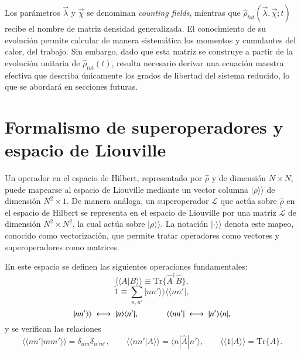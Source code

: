 Los parámetros $\vec{\lambda}$ y $\vec{\chi}$ se denominan \textit{counting fields}\cite{esposito2009nonequilibrium,landi2024current}, mientras que $\hat{\rho}_{tot}(\vec{\lambda},\vec{\chi};t)$ recibe el nombre de matriz densidad generalizada. El conocimiento de su evolución permite calcular de manera sistemática los momentos y cumulantes del calor, del trabajo. Sin embargo, dado que esta matriz se construye a partir de la evolución unitaria de $\hat{\rho}_{tot}(t)$, resulta necesario derivar una ecuación maestra efectiva que describa únicamente los grados de libertad del sistema reducido, lo que se abordará en secciones futuras.


\label{sec2:estadistica2puntos}

\section{Formalismo de superoperadores y espacio de Liouville} 

Un operador en el espacio de Hilbert, representado por $\hat{\rho}$ y de dimensión $N\times N$, puede mapearse al espacio de Liouville mediante un vector columna $|\rho \rangle \rangle$ de dimensión $N^{2}\times 1$. De manera análoga, un superoperador $\mathcal{L}$ que actúa sobre $\hat{\rho}$ en el espacio de Hilbert se representa en el espacio de Liouville por una matriz $\check{\mathcal{L}}$ de dimensión $N^2 \times N^2$, la cual actúa sobre $|\rho\rangle\rangle$. La notación $|\cdot\rangle\rangle$ denota este mapeo, conocido como vectorización, que permite tratar operadores como vectores y superoperadores como matrices.

En este espacio se definen las siguientes operaciones fundamentales:
\begin{equation*}
    \langle \langle A|B\rangle \rangle  \equiv \text{Tr}\{\hat{A}^{\dagger}\hat{B}\},
\end{equation*}
\begin{equation*}
    \check{1}  \equiv \sum_{n,n'}|nn'\rangle \rangle \langle \langle nn'|,
\end{equation*}
\begin{equation*}
     |nn'\rangle \rangle \;\longleftrightarrow\; |n\rangle \langle n'|,
     \hspace{12mm}  
     \langle \langle nn'| \;\longleftrightarrow\; |n'\rangle \langle n|,
\end{equation*}
y se verifican las relaciones
\begin{equation*}
     \langle \langle nn'|mm'\rangle \rangle  = \delta_{nm}\delta_{n'm'},
     \qquad
     \langle \langle nn'|A\rangle \rangle  = \langle n|\hat{A}|n'\rangle,
     \qquad
     \langle \langle 1|A\rangle \rangle  = \text{Tr}\{\hat{A}\}.
\end{equation*}


